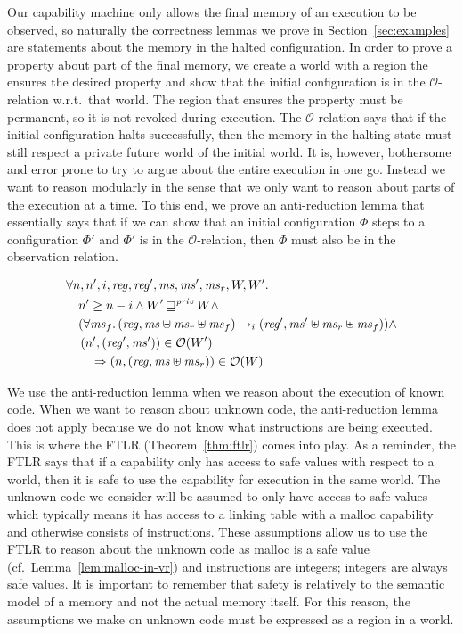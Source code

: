 \documentclass[format=acmsmall, review=true, screen=true]{acmart}
\renewcommand{\sectionname}{Section}
\newcommand{\var}[1]{\mathit{#1}}
\newcommand{\hs}{\var{ms}}
\newcommand{\ms}{\hs}
\newcommand{\reg}{\var{reg}}
\newcommand{\futurestr}{\mathbin{\sqsupseteq}^{\var{priv}}}
\newcommand{\observations}{\mathcal{O}}
\newcommand{\npair}[2][n]{\left(#1,#2 \right)}
\newcommand{\step}[1][]{\rightarrow_{#1}}
\newenvironment{toplas}{}{}
\begin{document}
\begin{toplas}
Our capability machine only allows the final memory of an execution to be observed, so naturally the correctness lemmas we prove in \sectionname~\ref{sec:examples} are statements about the memory in the halted configuration.
In order to prove a property about part of the final memory, we create a world with a region the ensures the desired property and show that the initial configuration is in the $\observations$-relation w.r.t.\ that world.
The region that ensures the property must be permanent, so it is not revoked during execution.
The $\observations$-relation says that if the initial configuration halts successfully, then the memory in the halting state must still respect a private future world of the initial world.
It is, however, bothersome and error prone to try to argue about the entire execution in one go.
Instead we want to reason modularly in the sense that we only want to reason about parts of the execution at a time.
To this end, we prove an anti-reduction lemma that essentially says that if we can show that an initial configuration $\Phi$ steps to a configuration $\Phi'$ and $\Phi'$ is in the $\observations$-relation, then $\Phi$ must also be in the observation relation.
\begin{lemma}[Anti-reduction for $\observations$]
\label{lem:anti-red-obs}
  \begin{align*}
    & \forall n, n',i,\reg, \reg', \ms, \ms', \ms_r, W, W' \ldotp\\
    & \quad n' \geq n - i \land W' \futurestr W \land \\
    & \quad (\forall \ms_f \ldotp (\reg,\ms \uplus \ms_r \uplus \ms_f) \step[i] (\reg',\ms' \uplus \ms_r \uplus \ms_f)) \land \\
    & \quad \npair[n']{(\reg',\ms')} \in \observations(W') \\
    & \qquad \Rightarrow \npair{(\reg,\ms \uplus \ms_r)} \in \observations(W)
  \end{align*}
\end{lemma}

We use the anti-reduction lemma when we reason about the execution of known code.
When we want to reason about unknown code, the anti-reduction lemma does not apply because we do not know what instructions are being executed.
This is where the FTLR (Theorem~\ref{thm:ftlr}) comes into play.
As a reminder, the FTLR says that if a capability only has access to safe values with respect to a world, then it is safe to use the capability for execution in the same world.
The unknown code we consider will be assumed to only have access to safe values which typically means it has access to a linking table with a malloc capability and otherwise consists of instructions.
These assumptions allow us to use the FTLR to reason about the unknown code as malloc is a safe value (cf.\ Lemma~\ref{lem:malloc-in-vr}) and instructions are integers; integers are always safe values.
It is important to remember that safety is relatively to the semantic model of a memory and not the actual memory itself.
For this reason, the assumptions we make on unknown code must be expressed as a region in a world.


\end{toplas}
\end{document}
